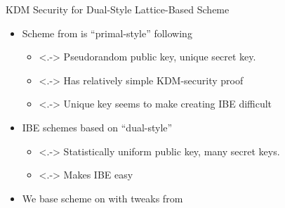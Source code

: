 \begin{frame}{KDM Security for Dual-Style Lattice-Based Scheme}

   \begin{itemize}
   \item<+-> Scheme from  is ``primal-style''
     following 
     \begin{itemize}
     \item<.-> \alert{Pseudorandom} public key, \alert{unique} secret
       key. \smallskip
     \item<.-> Has relatively simple KDM-security proof \smallskip
     \item<.-> Unique key seems to make creating IBE difficult
     \end{itemize}
   \item<+->  IBE schemes 
     based on ``dual-style'' 
     \begin{itemize}
     \item<.-> \alert{Statistically uniform} public key, \alert{many} \smallskip
       secret keys.
     \item<.-> Makes IBE easy
     \end{itemize}
   \item<+-> We base scheme on  with tweaks from 
   \end{itemize}
\end{frame}

